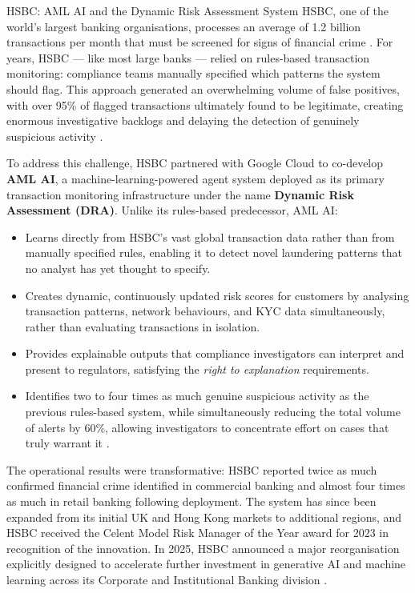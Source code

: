 \documentclass{article}
\begin{document}
\begin{usecasebox}{HSBC: AML AI and the Dynamic Risk Assessment System}
HSBC, one of the world's largest banking organisations, processes an average of 1.2 billion transactions per month that must be screened for signs of financial crime \cite{google_hsbc_aml}. For years, HSBC — like most large banks — relied on rules-based transaction monitoring: compliance teams manually specified which patterns the system should flag. This approach generated an overwhelming volume of false positives, with over 95\% of flagged transactions ultimately found to be legitimate, creating enormous investigative backlogs and delaying the detection of genuinely suspicious activity \cite{google_hsbc_aml}.

To address this challenge, HSBC partnered with Google Cloud to co-develop \textbf{AML AI}, a machine-learning-powered agent system deployed as its primary transaction monitoring infrastructure under the name \textbf{Dynamic Risk Assessment (DRA)}. Unlike its rules-based predecessor, AML AI:

\begin{itemize}
    \item Learns directly from HSBC's vast global transaction data rather than from manually specified rules, enabling it to detect novel laundering patterns that no analyst has yet thought to specify.
    \item Creates dynamic, continuously updated risk scores for customers by analysing transaction patterns, network behaviours, and KYC data simultaneously, rather than evaluating transactions in isolation.
    \item Provides explainable outputs that compliance investigators can interpret and present to regulators, satisfying the \emph{right to explanation} requirements.
    \item Identifies two to four times as much genuine suspicious activity as the previous rules-based system, while simultaneously reducing the total volume of alerts by 60\%, allowing investigators to concentrate effort on cases that truly warrant it \cite{google_hsbc_aml}.
\end{itemize}

The operational results were transformative: HSBC reported twice as much confirmed financial crime identified in commercial banking and almost four times as much in retail banking following deployment. The system has since been expanded from its initial UK and Hong Kong markets to additional regions, and HSBC received the Celent Model Risk Manager of the Year award for 2023 in recognition of the innovation. In 2025, HSBC announced a major reorganisation explicitly designed to accelerate further investment in generative AI and machine learning across its Corporate and Institutional Banking division \cite{klover_hsbc2025}.


\end{usecasebox}
\end{document}
